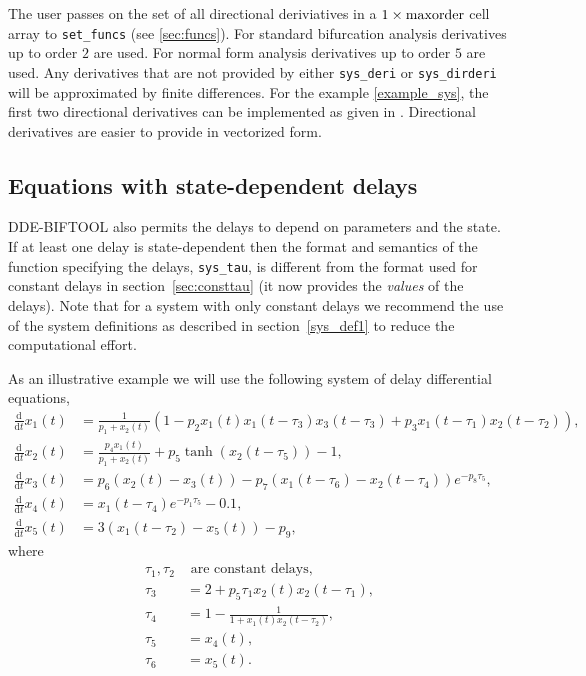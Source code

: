 \documentclass[10pt]{scrartcl}
\newcommand{\DDEBIFCODE}{\textsc{DDE-BIFTOOL}}
\renewcommand{\d}{\mathrm{d}}
\newcommand{\blist}[1]{\mbox{\lstinline!#1!}}
\begin{document}
The user passes on the set of all directional deriviatives in a
$1\times\blist{maxorder}$ cell array to \blist{set_funcs} (see
\cref{sec:funcs}). For standard bifurcation analysis derivatives up to
order $2$ are used. For normal form analysis derivatives up to order
$5$ are used. Any derivatives that are not provided by either
\blist{sys_deri} or \blist{sys_dirderi} will be approximated by finite
differences. For the example \eqref{example_sys}, the first two
directional derivatives can be implemented as given in
.  Directional derivatives are easier to
provide in vectorized form.

\subsection{Equations with state-dependent
  delays}\label{sys_def2}
\DDEBIFCODE{} also permits the delays to depend on parameters and the
state. If at least one delay is state-dependent then the format and
semantics of the function specifying the delays, \blist{sys_tau}, is
different from the format used for constant delays in
section~\ref{sec:consttau} (it now provides the \emph{values} of the
delays).  Note that for a system with only constant delays we
recommend the use of the system definitions as described in
section~\ref{sys_def1} to reduce the computational effort.

As an illustrative example we will use the following system of delay 
differential equations,
\begin{equation}\label{example_sys2}
  \begin{split}
    \frac{\d}{\d t}x_1(t)&=\frac{1}{p_1+x_2(t)}\left(1-p_2x_1(t)x_1(t-\tau_3)
      x_3(t-\tau_3)+p_3x_1(t-\tau_1)x_2(t-\tau_2)\right),\\
    \frac{\d}{\d t}x_2(t)&=\frac{p_4 x_1(t)}{p_1+x_2(t)}+
    p_5\tanh(x_2(t-\tau_5))-1,\\
    \frac{\d}{\d t}x_3(t)&=p_6(x_2(t)-x_3(t))-p_7(x_1(t-\tau_6)-x_2(t-\tau_4))e^{-p_8 \tau_5},\\
    \frac{\d}{\d t}x_4(t)&=x_1(t-\tau_4)e^{-p_1 \tau_5} -0.1,\\
    \frac{\d}{\d t}x_5(t)&=3(x_1(t-\tau_2)-x_5(t))-p_9,
  \end{split}
\end{equation}
where
\begin{align*}
\tau_1, \tau_2 &\mbox{ are constant delays},\\
\tau_3&=2+p_5\tau_1x_2(t)x_2(t-\tau_1),\\
\tau_4&=1-\frac{1}{1+x_1(t)x_2(t-\tau_2)},\\
\tau_5&=x_4(t),\\
\tau_6&=x_5(t).
\end{align*}
\end{document}
